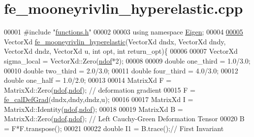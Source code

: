 \hypertarget{fe__mooneyrivlin__hyperelastic_8cpp_source}{}\section{fe\+\_\+mooneyrivlin\+\_\+hyperelastic.\+cpp}
\label{fe__mooneyrivlin__hyperelastic_8cpp_source}

\begin{DoxyCode}
00001 \textcolor{preprocessor}{#include "\hyperlink{functions_8h}{functions.h}"}
00002 
00003 \textcolor{keyword}{using namespace }\hyperlink{namespace_eigen}{Eigen};
00004 
\hyperlink{fe__mooneyrivlin__hyperelastic_8cpp_a66b469439c736421744f6aef9e05a485}{00005} VectorXd \hyperlink{fe__mooneyrivlin__hyperelastic_8cpp_a66b469439c736421744f6aef9e05a485}{fe\_mooneyrivlin\_hyperelastic}(VectorXd dndx, VectorXd dndy, VectorXd 
      dndz, VectorXd u, \textcolor{keywordtype}{int} opt, \textcolor{keywordtype}{int} return\_opt)\{
00006 
00007     VectorXd sigma\_local = VectorXd::Zero(\hyperlink{_global_variables_8h_aa789fe4d8a13fd0990b630909430d5d0}{ndof}*2);
00008 
00009     \textcolor{keywordtype}{double} one\_third = 1.0/3.0;
00010         \textcolor{keywordtype}{double} two\_third = 2.0/3.0;
00011         \textcolor{keywordtype}{double} four\_third = 4.0/3.0;
00012         \textcolor{keywordtype}{double} one\_half = 1.0/2.0;
00013 
00014         MatrixXd F = MatrixXd::Zero(\hyperlink{_global_variables_8h_aa789fe4d8a13fd0990b630909430d5d0}{ndof},\hyperlink{_global_variables_8h_aa789fe4d8a13fd0990b630909430d5d0}{ndof}); \textcolor{comment}{// deformation gradient}
00015         F = \hyperlink{functions_8h_ae50379f74802347e04dbc022897f9cb0}{fe\_calDefGrad}(dndx,dndy,dndz,u);
00016 
00017         MatrixXd I = MatrixXd::Identity(\hyperlink{_global_variables_8h_aa789fe4d8a13fd0990b630909430d5d0}{ndof},\hyperlink{_global_variables_8h_aa789fe4d8a13fd0990b630909430d5d0}{ndof});
00018 
00019         MatrixXd B = MatrixXd::Zero(\hyperlink{_global_variables_8h_aa789fe4d8a13fd0990b630909430d5d0}{ndof},\hyperlink{_global_variables_8h_aa789fe4d8a13fd0990b630909430d5d0}{ndof}); \textcolor{comment}{// Left Cauchy-Green Deformation Tensor}
00020         B = F*F.transpose();
00021 
00022         \textcolor{keywordtype}{double} I1 =  B.trace();\textcolor{comment}{// First Invariant}

\end{DoxyCode}
